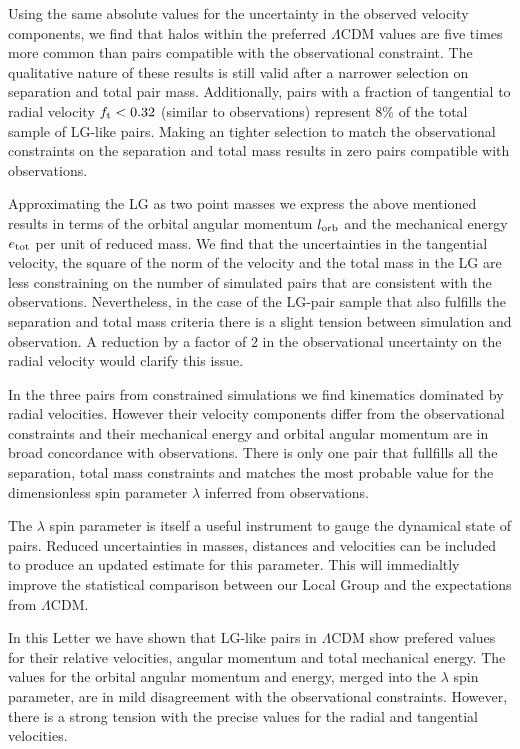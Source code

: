 \documentclass{emulateapj}
\begin{document}
Using the same absolute values for the uncertainty in the observed
velocity components, we find that halos within the preferred
$\Lambda$CDM values are five times more common than pairs compatible
with the observational constraint.  The qualitative nature of these
results is still valid after a narrower selection on separation and
total pair mass. Additionally, pairs with a fraction of tangential to
radial velocity $f_{\rm t}<0.32$ (similar to observations) represent
$8\%$ of the total sample of LG-like pairs. Making an tighter
selection to match the observational constraints on the separation and
total mass results in zero pairs compatible with observations. 

Approximating the LG as two point masses we express the above
mentioned results in terms of the orbital angular momentum $l_{\rm
  orb}$ and the mechanical energy $e_{\rm tot}$ per unit of reduced
mass. We find that the uncertainties in the tangential velocity, the
square of the norm of the velocity and the total mass in the LG
are less constraining on the number of simulated pairs that are
consistent with the observations. Nevertheless, in the case of the
LG-pair sample that also fulfills the separation and total mass
criteria there is a slight tension between simulation and
observation. A reduction by a factor of $2$ in the observational
uncertainty on the radial velocity would clarify this issue. 

In the three pairs from constrained simulations we find kinematics
dominated by radial velocities. However their velocity components
differ from the observational constraints and their mechanical energy
and orbital angular momentum are in broad concordance with
observations. There is only one pair that fullfills all the
separation, total mass constraints and matches the most probable value
for the dimensionless spin parameter $\lambda$ inferred from
observations.  

The $\lambda$ spin parameter is itself a useful instrument to gauge
the dynamical state of pairs. Reduced uncertainties in masses,
distances and velocities can be included to produce an updated
estimate for this parameter. This will immedialtly improve the
statistical comparison between our Local Group and the expectations
from $\Lambda$CDM. 

In this Letter we have shown that LG-like pairs in $\Lambda$CDM show
prefered values for their relative velocities, angular momentum and
total mechanical energy. The values for the orbital angular momentum
and energy, merged into the $\lambda$ spin parameter, are in mild
disagreement with the observational constraints. However, there is a
strong tension with the precise values for the radial and tangential
velocities. 
\end{document}
